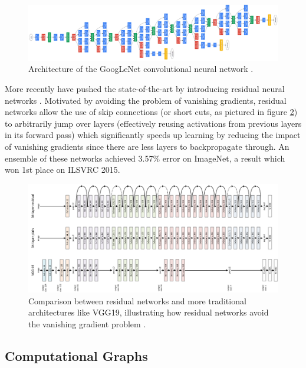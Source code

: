 \begin{figure}[ht]
    \centering
    \includegraphics[width=1.0\textwidth]{figs/inceptionv1.png}
    \caption{Architecture of the GoogLeNet convolutional neural network \cite{inceptionv1}.}
    \label{fig:inceptionv3}
\end{figure}

More recently \citeauthor{resnet} have pushed the state-of-the-art by introducing residual neural networks \cite{resnet}. Motivated by avoiding the problem of vanishing gradients, residual networks allow the use of skip connections (or short cuts, as pictured in figure \ref{fig:resnet50}) to arbitrarily jump over layers (effectively reusing activations from previous layers in its forward pass) which significantly speeds up learning by reducing the impact of vanishing gradients since there are less layers to backpropagate through. An ensemble of these networks achieved 3.57\% error on ImageNet, a result which won 1st place on \ac{ILSVRC} 2015.

\begin{figure}[ht]
    \centering
    \includegraphics[width=1.0\textwidth]{figs/resnet50.png}
    \caption{Comparison between residual networks and more traditional architectures like VGG19, illustrating how residual networks avoid the vanishing gradient problem \cite{resnet}.}
    \label{fig:resnet50}
\end{figure}

\subsection{Computational Graphs}

